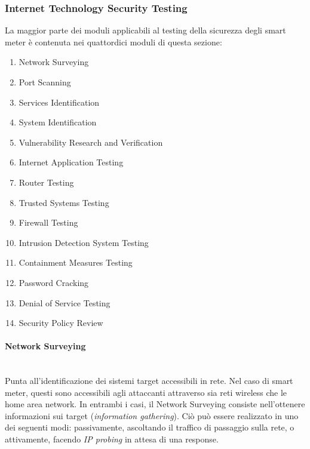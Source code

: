 \subsubsection{Internet Technology Security Testing}
La maggior parte dei moduli applicabili al testing della sicurezza degli smart meter è contenuta nei quattordici moduli di questa sezione:
\begin{enumerate}
	\item Network Surveying
	\item Port Scanning
	\item Services Identification
	\item System Identification
	\item Vulnerability Research and Verification
	\item Internet Application Testing
	\item Router Testing
	\item Trusted Systems Testing
	\item Firewall Testing
	\item Intrusion Detection System Testing
	\item Containment Measures Testing
	\item Password Cracking
	\item Denial of Service Testing
	\item Security Policy Review
\end{enumerate}

\paragraph{Network Surveying}\mbox{}\\
Punta all'identificazione dei sistemi target accessibili in rete. Nel caso di smart meter, questi sono accessibili agli attaccanti attraverso sia reti wireless che le home area network. In entrambi i casi, il Network Surveying consiste nell'ottenere informazioni sui target (\emph{information gathering}). 
Ciò può essere realizzato in uno dei seguenti modi: passivamente, ascoltando il traffico di passaggio sulla rete, o attivamente, facendo \emph{IP probing} in attesa di una response.\\

